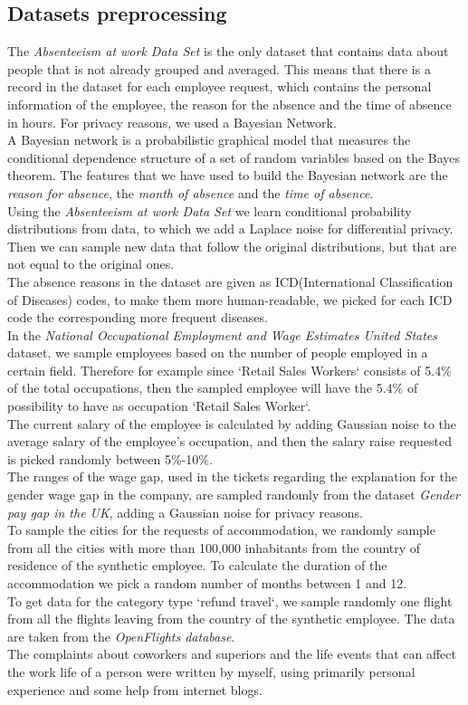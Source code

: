 \subsection{Datasets preprocessing}
The \textit{Absenteeism at work Data Set} is the only dataset that contains data about people that is not already grouped and averaged. This means that there is a record in the dataset for each employee request, which contains the personal information of the employee, the reason for the absence and the time of absence in hours. For privacy reasons, we used a Bayesian Network. \\ 
A Bayesian network is a probabilistic graphical model that measures the conditional dependence structure of a set of random variables based on the Bayes theorem. The features that we have used to build the Bayesian network are the \textit{reason for absence}, the \textit{month of absence} and the \textit{time of absence}.
\\
Using the \textit{Absenteeism at work Data Set} we learn conditional probability distributions from data, to which we add a Laplace noise for differential privacy. Then we can sample new data that follow the original distributions, but that are not equal to the original ones. \\
The absence reasons in the dataset are given as ICD(International Classification of Diseases) codes, to make them more human-readable, we picked for each ICD code the corresponding more frequent diseases. \\
In the \textit{National Occupational Employment and Wage Estimates United States} dataset, we sample employees based on the number of people employed in a certain field. Therefore for example since `Retail Sales Workers` consists of 5.4\% of the total occupations, then the sampled employee will have the 5.4\% of possibility to have as occupation `Retail Sales Worker`. \\
The current salary of the employee is calculated by adding Gaussian noise to the average salary of the employee's occupation, and then the salary raise requested is picked randomly between 5\%-10\%. \\
The ranges of the wage gap, used in the tickets regarding the explanation for the gender wage gap in the company, are sampled randomly from the dataset \textit{Gender pay gap in the UK}, adding a Gaussian noise for privacy reasons. \\
To sample the cities for the requests of accommodation, we randomly sample from all the cities with more than 100,000 inhabitants from the country of residence of the synthetic employee. To calculate the duration of the accommodation we pick a random number of months between 1 and 12. \\
To get data for the category type `refund travel`, we sample randomly one flight from all the flights leaving from the country of the synthetic employee. The data are taken from the \textit{OpenFlights database}. \\
The complaints about coworkers and superiors and the life events that can affect the work life of a person were written by myself, using primarily personal experience and some help from internet blogs.